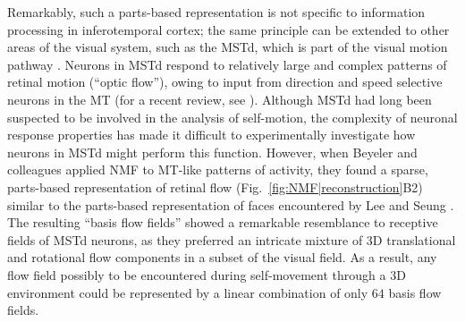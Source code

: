 Remarkably, such a parts-based representation is not specific to
information processing in inferotemporal cortex; 
the same principle can be extended to other areas of the visual system,
such as the \ac{MSTd},
which is part of the visual motion pathway \citep{Beyeler2016}.
Neurons in \ac{MSTd} respond to relatively large and complex patterns
of retinal motion (``optic flow''),
owing to input from direction and speed selective neurons in the \ac{MT}
(for a recent review, see \cite{Orban2007}).
Although \ac{MSTd} had long been suspected to be involved in the
analysis of self-motion,
the complexity of neuronal response properties has made it difficult
to experimentally investigate how neurons in \ac{MSTd}
might perform this function.
However, when Beyeler and colleagues \citep{Beyeler2016}
applied \ac{NMF} to \ac{MT}-like patterns of activity,
they found a sparse, parts-based representation of retinal flow
(Fig.~\ref{fig:NMF|reconstruction}B2)
similar to the parts-based representation of faces
encountered by Lee and Seung \cite{LeeSeung1999}.
The resulting ``basis flow fields'' showed a remarkable resemblance to receptive fields
of \ac{MSTd} neurons, as they preferred an intricate mixture of
3D translational and rotational flow components
in a subset of the visual field.
As a result, any flow field possibly to be encountered 
during self-movement through a 3D environment
could be represented by a linear combination
of only $64$ basis flow fields.

